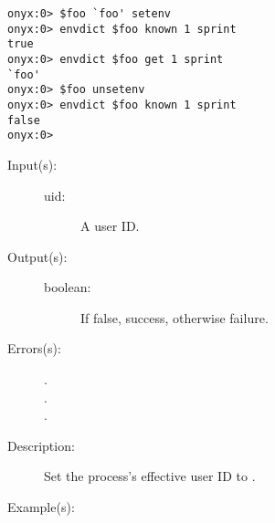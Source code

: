 \begin{description}
\begin{description}
\begin{verbatim}
onyx:0> $foo `foo' setenv
onyx:0> envdict $foo known 1 sprint
true
onyx:0> envdict $foo get 1 sprint
`foo'
onyx:0> $foo unsetenv
onyx:0> envdict $foo known 1 sprint
false
onyx:0>
		\end{verbatim}
	\end{description}
\label{systemdict:seteuid}
\item[{\onyxop{uid}{seteuid}{boolean}}: ]
	\begin{description}\item[]
	\item[Input(s): ]
		\begin{description}\item[]
		\item[uid: ]
			A user ID.
		\end{description}
	\item[Output(s): ]
		\begin{description}\item[]
		\item[boolean: ]
			If false, success, otherwise failure.
		\end{description}
	\item[Errors(s): ]
		\begin{description}\item[]
		\item[.]
		\item[.]
		\item[.]
		\end{description}
	\item[Description: ]
		Set the process's effective user ID to .
	\item[Example(s): ]\begin{verbatim}


\end{verbatim}
\end{description}
\end{description}
